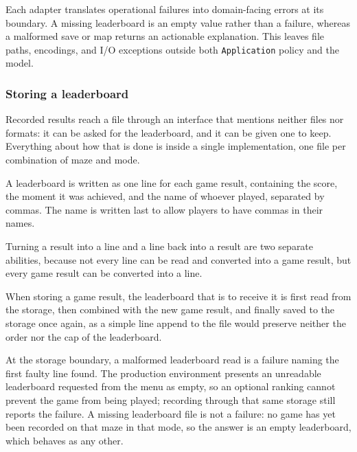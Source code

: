 Each adapter translates operational failures into domain-facing errors at its boundary. A missing leaderboard is an
empty value rather than a failure, whereas a malformed save or map returns an actionable explanation. This leaves file
paths, encodings, and I/O exceptions outside both \texttt{Application} policy and the model.

\subsubsection{Storing a leaderboard}

Recorded results reach a file through an interface that mentions neither files nor formats: it can be asked for the
leaderboard, and it can be given one to keep. Everything about how that is done is inside a single implementation,
one file per combination of maze and mode.

A leaderboard is written as one line for each game result, containing the score, the moment it was achieved, and the
name of whoever played, separated by commas. The name is written last to allow players to have commas in their names.

Turning a result into a line and a line back into a result are two separate abilities, because not every line can be
read and converted into a game result, but every game result can be converted into a line.

When storing a game result, the leaderboard that is to receive it is first read from the storage, then combined with
the new game result, and finally saved to the storage once again, as a simple line append to the file would preserve
neither the order nor the cap of the leaderboard.

At the storage boundary, a malformed leaderboard read is a failure naming the first faulty line found. The production
environment presents an unreadable leaderboard requested from the menu as empty, so an optional ranking cannot prevent
the game from being played; recording through that same storage still reports the failure. A missing leaderboard file
is not a failure: no game has yet been recorded on that maze in that mode, so the answer is an empty leaderboard,
which behaves as any other.
